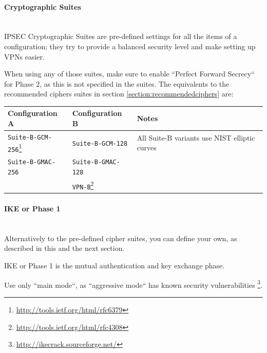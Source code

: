 \begin{description}
\paragraph*{Cryptographic Suites}\mbox{}\\

IPSEC Cryptographic Suites are pre-defined settings for all the
items of a configuration; they try to provide a balanced security
level and make setting up VPNs easier.

When using any of those suites, make sure to enable ``Perfect Forward
Secrecy`` for Phase 2, as this is not specified in the suites. The
equivalents to the recommended ciphers suites in section
\ref{section:recommendedciphers} are:

\begin{table}[h]
  \centering
  \small
  \begin{tabular}{lll}
    \toprule
    Configuration A & Configuration B & Notes\\
    \midrule
    \verb|Suite-B-GCM-256|\footnote{\url{http://tools.ietf.org/html/rfc6379}} &
\verb|Suite-B-GCM-128| & All Suite-B variants use NIST elliptic curves
\\ \verb|Suite-B-GMAC-256| & \verb|Suite-B-GMAC-128| & 
\\ & \verb|VPN-B|\footnote{\url{http://tools.ietf.org/html/rfc4308}} &
\\
    \bottomrule
  \end{tabular}
\end{table}

\paragraph*{IKE or Phase 1}\mbox{}\\

Alternatively to the pre-defined cipher suites, you can define your
own, as described in this and the next section.

IKE or Phase 1 is the mutual authentication and key exchange phase.

Use only ``main mode``, as ``aggressive mode`` has known security
vulnerabilities \footnote{\url{http://ikecrack.sourceforge.net/}}.



\end{description}
